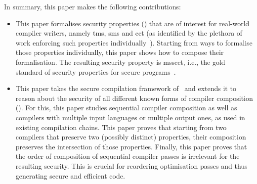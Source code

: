 \documentclass[dvipsnames,conference]{IEEEtran}
\theoremstyle{definition}
\begin{document}
In summary, this paper makes the following contributions:
\begin{itemize}
  \item %
        This paper formalises security properties () that are of interest for real-world compiler writers, namely \gls*{tms}, \gls*{sms} and \gls*{cct} (as identified by the plethora of work enforcing such properties individually~\cite{akritidis2009baggy,nagarakatte2009soft,nagarakatte2010cets,dhumbumroong2020boundwarden,jung2021pico,nam2019framer,shankaranarayana2023tailcheck,younan2010paricheck,zhou2023fatptrs,bond2017vale,almeida2017jasmin,kuepper2023cryptopt,cauligi2019fact}).
        Starting from ways to formalise those properties individually, this paper shows how to compose their formalisation.
        The resulting security property is \gls*{msscct}, i.e., the gold standard of security properties for secure programs~\cite{lemay2021ccc}.


  \item %
        This paper takes the secure compilation framework of~\cite{abate2019jour} and extends it to reason about the security of all different known forms of compiler composition ().
        For this, this paper studies sequential compiler composition as well as compilers with multiple input languages or multiple output ones, as used in existing compilation chains.
        This paper proves that starting from two compilers that preserve two (possibly distinct) properties, their composition preserves the intersection of those properties.
        Finally, this paper proves that the order of composition of sequential compiler passes is irrelevant for the resulting security.
        This is crucial for reordering optimisation passes and thus generating secure and efficient code.


\end{itemize}
\end{document}
